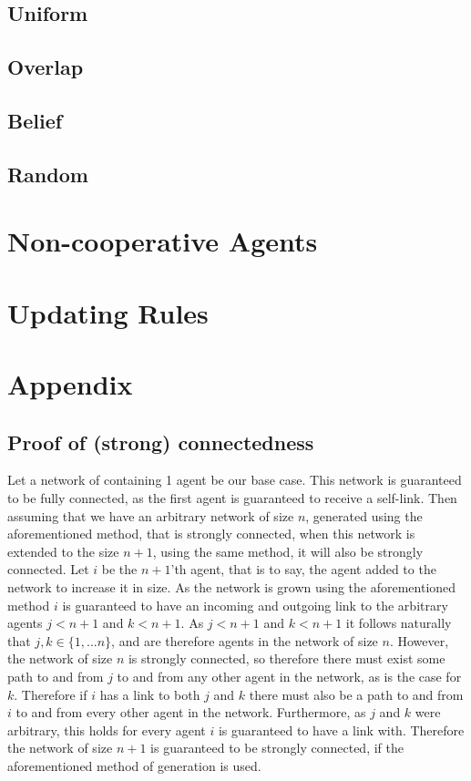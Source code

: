 \documentclass{article}
\begin{document}
\subsection{Uniform}
\subsection{Overlap}
\subsection{Belief}
\subsection{Random}

\section{Non-cooperative Agents}

\section{Updating Rules}
\newpage
\section{Appendix}
\subsection{Proof of (strong) connectedness}
Let a network of containing 1 agent be our base case. This network is guaranteed to be fully connected, as the first agent is guaranteed to receive a self-link. Then assuming that we have an arbitrary network of size $n$, generated using the aforementioned method, that is strongly connected, when this network is extended to the size $n+1$, using the same method, it will also be strongly connected. Let $i$ be the $n+1$'th agent, that is to say, the agent added to the network to increase it in size. As the network is grown using the aforementioned method $i$ is guaranteed to have an incoming and outgoing link to the arbitrary agents $j < n+1$ and $k < n+1$. As $j < n+1$ and $k < n+1$ it follows naturally that $j, k \in \{1, ... n\}$, and are therefore agents in the network of size $n$. However, the network of size $n$ is strongly connected, so therefore there must exist some path to and from $j$ to and from any other agent in the network, as is the case for $k$. Therefore if $i$ has a link to both $j$ and $k$ there must also be a path to and from $i$ to and from every other agent in the network. Furthermore, as $j$ and $k$ were arbitrary, this holds for every agent $i$ is guaranteed to have a link with. Therefore the network of size $n+1$ is guaranteed to be strongly connected, if the aforementioned method of generation is used.\newline

\newpage
\end{document}
